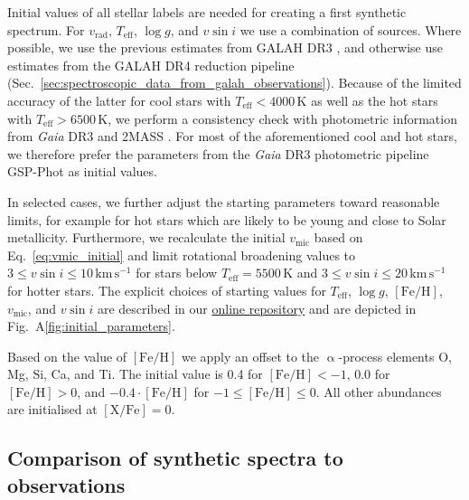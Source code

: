 \documentclass[
  journal=pasa,
  manuscript=research-paper, %
  year=2024,
  volume=37
]{cup-journal}
\newcommand{\Teff}{$T_\mathrm{eff}$\xspace}
\newcommand{\logg}{$\log g$\xspace}
\newcommand{\feh}{$\mathrm{[Fe/H]}$\xspace}
\newcommand{\vmic}{$v_\mathrm{mic}$\xspace}
\newcommand{\vsini}{$v \sin i$\xspace}
\newcommand{\vrad}{$v_\mathrm{rad}$\xspace}
\newcommand{\Gaia}{\textit{Gaia}\xspace}
\begin{document}

Initial values of all stellar labels are needed for creating a first synthetic spectrum. For \vrad, \Teff, \logg, and \vsini we use a combination of sources. Where possible, we use the previous estimates from GALAH DR3 \citep{Buder2021}, and otherwise use estimates from the GALAH DR4 reduction pipeline (Sec.~\ref{sec:spectroscopic_data_from_galah_observations}). Because of the limited accuracy of the latter for cool stars with $T_\text{eff} < 4000\,\mathrm{K}$ as well as the hot stars with $T_\text{eff} > 6500\,\mathrm{K}$, we perform a consistency check with photometric information from \Gaia DR3 \citep{Brown2021} and 2MASS \citep{Skrutskie2006}. For most of the aforementioned cool and hot stars, we therefore prefer the parameters from the \Gaia DR3 photometric pipeline GSP-Phot \citep{Andrae2022,Fouesneau2022} as initial values.

In selected cases, we further adjust the starting parameters toward reasonable limits, for example for hot stars which are likely to be young and close to Solar metallicity. Furthermore, we recalculate the initial \vmic based on Eq.~\ref{eq:vmic_initial} and limit rotational broadening values to $3 \leq v \sin i \leq 10\,\mathrm{km\,s^{-1}}$ for stars below $T_\text{eff} = 5500\,\mathrm{K}$ and $3 \leq v \sin i \leq 20\,\mathrm{km\,s^{-1}}$ for hotter stars. The explicit choices of starting values for \Teff, \logg, \feh, \vmic, and \vsini are described in our \href{https://github.com/svenbuder/GALAH_DR4/blob/main/spectrum_analysis/galah_dr4_initial_parameters.ipynb}{online repository} and are depicted in Fig.~A\ref{fig:initial_parameters}.

Based on the value of \feh we apply an offset to the $\upalpha$-process elements O, Mg, Si, Ca, and Ti. The initial value is 0.4 for $\mathrm{[Fe/H]} < -1$, 0.0 for $\mathrm{[Fe/H]} > 0$, and $-0.4 \cdot \mathrm{[Fe/H]}$ for $-1 \leq \mathrm{[Fe/H]} \leq 0$. All other abundances are initialised at $\mathrm{[X/Fe]} = 0$.

\subsection{Comparison of synthetic spectra to observations}
\label{sec:comparison_synthetic_spectra_to_observations}
\end{document}
